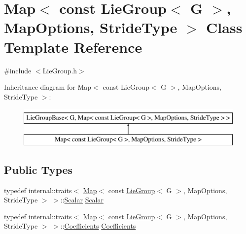 \hypertarget{class_map_3_01const_01_lie_group_3_01_g_01_4_00_01_map_options_00_01_stride_type_01_4}{}\section{Map$<$ const Lie\+Group$<$ G $>$, Map\+Options, Stride\+Type $>$ Class Template Reference}
\label{class_map_3_01const_01_lie_group_3_01_g_01_4_00_01_map_options_00_01_stride_type_01_4}


{\ttfamily \#include $<$Lie\+Group.\+h$>$}

Inheritance diagram for Map$<$ const Lie\+Group$<$ G $>$, Map\+Options, Stride\+Type $>$\+:\begin{figure}[H]
\begin{center}
\leavevmode
\includegraphics[height=2.000000cm]{class_map_3_01const_01_lie_group_3_01_g_01_4_00_01_map_options_00_01_stride_type_01_4}
\end{center}
\end{figure}
\subsection*{Public Types}
\begin{DoxyCompactItemize}
\item 
typedef internal\+::traits$<$ \hyperlink{class_map_3_01const_01_lie_group_3_01_g_01_4_00_01_map_options_00_01_stride_type_01_4_a95174b5f6c93ceefa0fbc6ef6fdf65f7}{Map}$<$ const \hyperlink{class_lie_group}{Lie\+Group}$<$ G $>$, Map\+Options, Stride\+Type $>$ $>$\+::\hyperlink{class_map_3_01const_01_lie_group_3_01_g_01_4_00_01_map_options_00_01_stride_type_01_4_a006635f5fe4155200809ee347f61b9a6}{Scalar} \hyperlink{class_map_3_01const_01_lie_group_3_01_g_01_4_00_01_map_options_00_01_stride_type_01_4_a006635f5fe4155200809ee347f61b9a6}{Scalar}
\item 
typedef internal\+::traits$<$ \hyperlink{class_map_3_01const_01_lie_group_3_01_g_01_4_00_01_map_options_00_01_stride_type_01_4_a95174b5f6c93ceefa0fbc6ef6fdf65f7}{Map}$<$ const \hyperlink{class_lie_group}{Lie\+Group}$<$ G $>$, Map\+Options, Stride\+Type $>$ $>$\+::\hyperlink{class_map_3_01const_01_lie_group_3_01_g_01_4_00_01_map_options_00_01_stride_type_01_4_a670729f8e6ab1131541ef46da7d09274}{Coefficients} \hyperlink{class_map_3_01const_01_lie_group_3_01_g_01_4_00_01_map_options_00_01_stride_type_01_4_a670729f8e6ab1131541ef46da7d09274}{Coefficients}
\end{DoxyCompactItemize}
